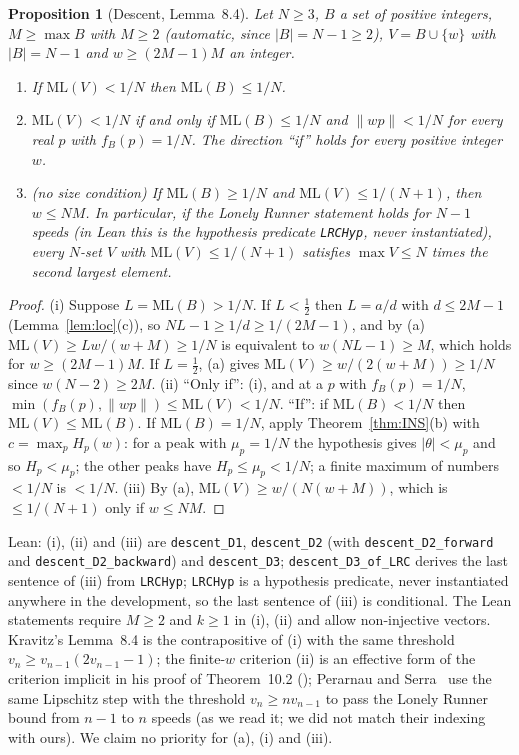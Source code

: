 \documentclass[11pt]{article}
\newtheorem{proposition}[theorem]{Proposition}
\theoremstyle{definition}
\theoremstyle{remark}
\newcommand{\nd}[1]{\lVert #1\rVert}
\newcommand{\ML}{\mathrm{ML}}
\begin{document}
\begin{proposition}[Descent, \cite{K} Lemma~8.4]\label{prop:descent}
Let $N\ge3$, $B$ a set of positive integers, $M\ge\max B$ with $M\ge2$ (automatic, since $|B|=N-1\ge2$), $V=B\cup\{w\}$ with $|B|=N-1$ and $w\ge(2M-1)M$ an integer.
\begin{enumerate}[label=(\roman*),nosep]
\item If $\ML(V)<1/N$ then $\ML(B)\le1/N$.
\item $\ML(V)<1/N$ if and only if $\ML(B)\le1/N$ and $\nd{wp}<1/N$ for every real $p$ with $f_B(p)=1/N$. The direction ``if'' holds for every positive integer $w$.
\item (no size condition) If $\ML(B)\ge1/N$ and $\ML(V)\le1/(N+1)$, then $w\le NM$. In particular, if the Lonely Runner statement holds for $N-1$ speeds (in Lean this is the hypothesis predicate \texttt{LRCHyp}, never instantiated), every $N$-set $V$ with $\ML(V)\le1/(N+1)$ satisfies $\max V\le N$ times the second largest element.
\end{enumerate}
\end{proposition}
\begin{proof}
(i) Suppose $L=\ML(B)>1/N$. If $L<\frac12$ then $L=a/d$ with $d\le2M-1$ (Lemma~\ref{lem:loc}(c)), so $NL-1\ge1/d\ge1/(2M-1)$, and by (a) $\ML(V)\ge Lw/(w+M)\ge1/N$ is equivalent to $w(NL-1)\ge M$, which holds for $w\ge(2M-1)M$. If $L=\frac12$, (a) gives $\ML(V)\ge w/(2(w+M))\ge1/N$ since $w(N-2)\ge2M$. (ii) ``Only if'': (i), and at a $p$ with $f_B(p)=1/N$, $\min(f_B(p),\nd{wp})\le\ML(V)<1/N$. ``If'': if $\ML(B)<1/N$ then $\ML(V)\le\ML(B)$. If $\ML(B)=1/N$, apply Theorem~\ref{thm:INS}(b) with $c=\max_pH_p(w)$: for a peak with $\mu_p=1/N$ the hypothesis gives $|\theta|<\mu_p$ and so $H_p<\mu_p$; the other peaks have $H_p\le\mu_p<1/N$; a finite maximum of numbers $<1/N$ is $<1/N$. (iii) By (a), $\ML(V)\ge w/(N(w+M))$, which is $\le1/(N+1)$ only if $w\le NM$.
\end{proof}
Lean: (i), (ii) and (iii) are \texttt{descent\_D1}, \texttt{descent\_D2} (with \texttt{descent\_D2\_forward} and \texttt{descent\_D2\_backward}) and \texttt{descent\_D3}; \texttt{descent\_D3\_of\_LRC} derives the last sentence of (iii) from \texttt{LRCHyp}; \texttt{LRCHyp} is a hypothesis predicate, never instantiated anywhere in the development, so the last sentence of (iii) is conditional. The Lean statements require $M\ge2$ and $k\ge1$ in (i), (ii) and allow non-injective vectors. Kravitz's Lemma~8.4 is the contrapositive of (i) with the same threshold $v_n\ge v_{n-1}(2v_{n-1}-1)$; the finite-$w$ criterion (ii) is an effective form of the criterion implicit in his proof of Theorem~10.2 (\cite[p.~21]{K}); Perarnau and Serra~\cite[Section~7.1]{PS} use the same Lipschitz step with the threshold $v_n\ge nv_{n-1}$ to pass the Lonely Runner bound from $n-1$ to $n$ speeds (as we read it; we did not match their indexing with ours). We claim no priority for (a), (i) and (iii).
\end{document}

